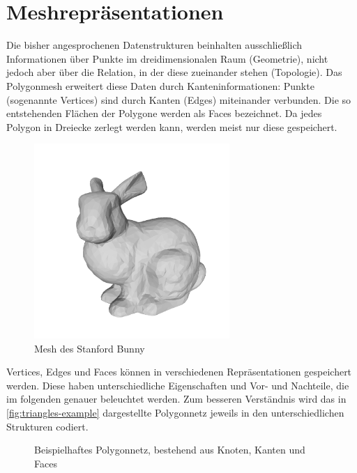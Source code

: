 \section{Meshrepräsentationen}
\label{sec:meshrepr}

Die bisher angesprochenen Datenstrukturen beinhalten ausschließlich Informationen über Punkte im dreidimensionalen Raum (Geometrie), nicht jedoch aber über die Relation, in der diese zueinander stehen (Topologie).
Das Polygonmesh erweitert diese Daten durch Kanteninformationen: Punkte (sogenannte Vertices) sind durch Kanten (Edges) miteinander verbunden.
Die so entstehenden Flächen der Polygone werden als Faces bezeichnet.
Da jedes Polygon in Dreiecke zerlegt werden kann, werden meist nur diese gespeichert.

\begin{figure}[ht]
	\centering
	\includegraphics[width=0.66\textwidth, frame]{images/bunny_mesh.png}
	\caption{Mesh des Stanford Bunny \cite{stanfordbunny}}
	\label{fig:bunny_mesh}
\end{figure}

Vertices, Edges und Faces können in verschiedenen Repräsentationen gespeichert werden.
Diese haben unterschiedliche Eigenschaften und Vor- und Nachteile, die im folgenden genauer beleuchtet werden.
Zum besseren Verständnis wird das in \autoref{fig:triangles-example} dargestellte Polygonnetz jeweils in den unterschiedlichen Strukturen codiert.

\begin{figure}[ht]
\centering
{}
\caption{Beispielhaftes Polygonnetz, bestehend aus Knoten, Kanten und Faces}
\label{fig:triangles-example}
\end{figure}

